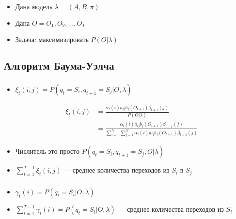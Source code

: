 \documentclass{beamer}
\begin{document}
\subsection{}


\begin{frame}
  \frametitle{\insertsection}
  \framesubtitle{\insertsubsection}
  \begin{itemize}
  \item Дана модель $\lambda = (A, B, \pi)$ \pause
  \item Дана $O = O_1, O_2, \ldots, O_T$ \pause
  \item Задача: максимизировать $P(O|\lambda)$
  \end{itemize}
\end{frame}

\subsection{Алгоритм Баума-Уэлча}

\begin{frame}
  \frametitle{\insertsection}
  \framesubtitle{\insertsubsection}
  \begin{itemize}
  \item $\xi_t(i, j) = P(q_t = S_i, q_{t + 1} = S_j | O, \lambda)$ \pause

  \begin{align*}
    \displaystyle \xi_t(i, j) &=
    \frac{\alpha_t(i) a_{ij} b_j(O_{t + 1}) \beta_{t + 1}(j)}{P(O | \lambda)} \\
    &= \frac{\alpha_t(i) a_{ij} b_j(O_{t + 1}) \beta_{t + 1}(j)}{\sum_{i = 1}^{N} \sum_{j = 1}^{N} \alpha_t(i) a_{ij} b_j(O_{t + 1}) \beta_{t + 1}(j)}
  \end{align*}

\item Числитель это просто $P(q_t = S_i, q_{t + 1} = S_j , O | \lambda)$ \pause
  \item $\displaystyle \sum_{t = 1}^{T - 1} \xi_t(i, j)$ --- среднее количества переходов из $S_i$ в $S_j$
  \end{itemize}
\end{frame}

\begin{frame}
  \frametitle{\insertsection}
  \framesubtitle{\insertsubsection}

  \begin{itemize}
  \item $\displaystyle \gamma_t(i) = P(q_t = S_i | O, \lambda)$
  \item $\displaystyle \sum_{t = 1}^{T - 1} \gamma_t(i) = P(q_t = S_i | O, \lambda)$ --- среднее количества переходов из $S_i$
  \end{itemize}
\end{frame}
\end{document}
